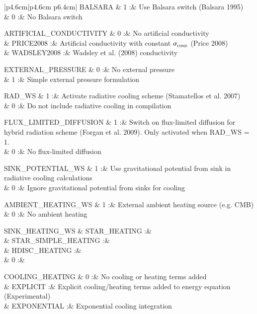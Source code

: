\documentclass[a4paper]{article}
\begin{document}
\begin{center}
\begin{supertabular}{|p{4.6cm}|p{4.6cm} p{6.4cm}|}
 BALSARA       & 1  :& Use Balsara switch (Balsara 1995) \\
               & 0  :& No Balsara switch \\ \hline

 ARTIFICIAL\_CONDUCTIVITY  & 0         :& No artificial conductivity \\
                           & PRICE2008 :& Artificial conductivity with constant $\alpha_{_{\rm COND}}$ (Price 2008)\\ 
                           & WADSLEY2008 :& Wadsley et al. (2008) conductivity\\ \hline

 EXTERNAL\_PRESSURE & 0 :& No external pressure \\
                    & 1 :& Simple external pressure formulation \\ \hline

 RAD\_WS       & 1 :& Activate radiative cooling scheme (Stamatellos et al. 2007) \\
               & 0 :& Do not include radiative cooling in compilation \\ \hline

 FLUX\_LIMITED\_DIFFUSION & 1 :& Switch on flux-limited diffusion for hybrid radiation scheme (Forgan et al. 2009).  Only activated when RAD\_WS = 1. \\
                          & 0 :& No flux-limited diffusion \\ \hline

 SINK\_POTENTIAL\_WS      & 1 :& Use gravitational potential from sink in radiative cooling calculations \\
                          & 0 :& Ignore gravitational potential from sinks for cooling \\ \hline

 AMBIENT\_HEATING\_WS     & 1 :& External ambient heating source (e.g. CMB)\\ 
                          & 0 :& No ambient heating \\ \hline

 SINK\_HEATING\_WS        & STAR\_HEATING :& \\ 
                          & STAR\_SIMPLE\_HEATING :& \\
                          & HDISC\_HEATING :& \\
                          & 0 :& \\ \hline

 COOLING\_HEATING    & 0 :& No cooling or heating terms added \\
                     & EXPLICIT :& Explicit cooling/heating terms added to energy equation (Experimental) \\ 
                     & EXPONENTIAL :& Exponential cooling integration \\ \hline


\end{supertabular}
\end{center}
\end{document}
